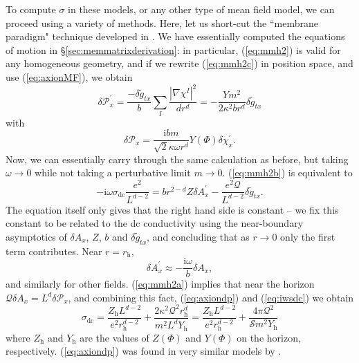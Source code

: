 \documentclass[10pt, oneside]{book}
\begin{document}
\begin{doublespace}
To compute $\sigma$ in these models, or any other type of mean field model, we can proceed using a variety of methods.   Here, let us short-cut the ``membrane paradigm" technique developed in \cite{Blake:2013bqa}.  We have essentially computed the equations of motion in  \S\ref{sec:memmatrixderivation}:  in particular, (\ref{eq:mmh2}) is valid for any homogeneous geometry, and if we rewrite (\ref{eq:mmh2c}) in position space, and use (\ref{eq:axionMF}), we obtain \begin{equation}
\delta \mathcal{P}_x^\prime = \frac{-\delta \tilde{g}_{tx}}{b} \sum_I \frac{|\nabla \chi^I|^2}{dr^d} = -\frac{Ym^2}{2\kappa^2 br^d}\delta \tilde{g}_{tx}   \label{eq:axiondp}
\end{equation}
with \begin{equation}
\delta \mathcal{P}_x = \frac{\mathrm{i}bm}{\sqrt{2}\kappa \omega r^d} Y(\Phi)  \delta \chi_x^\prime .
\end{equation}
Now,  we can essentially carry through the same calculation as before,  but taking $\omega\rightarrow 0$ while not taking a perturbative limit $m\rightarrow 0$.  (\ref{eq:mmh2b}) is equivalent to \begin{equation}
-\mathrm{i}\omega \sigma_{\mathrm{dc}} \frac{e^2}{L^{d-2}}  = br^{2-d}Z\delta A_x^\prime - \frac{e^2\mathcal{Q}}{L^{d-2}}\delta \tilde{g}_{tx}.  \label{eq:iwsdc}
\end{equation}
The equation itself only gives that the right hand side is constant -- we fix this constant to be related to the dc conductivity using the near-boundary asymptotics of $\delta A_x$, $Z$, $b$ and $\delta \tilde{g}_{tx}$, and concluding that as $r\rightarrow 0$ only the first term contributes.    Near $r=r_{\mathrm{h}}$,  \begin{equation}
\delta A_x^\prime \approx -\frac{\mathrm{i}\omega}{b} \delta A_x,  \label{eq:infallb}
\end{equation}and similarly for other fields.   (\ref{eq:mmh2a}) implies that near the horizon $\mathcal{Q}\delta A_x = L^d \delta \mathcal{P}_x$, and combining this fact,  (\ref{eq:axiondp}) and (\ref{eq:iwsdc}) we obtain \begin{equation}
\sigma_{\mathrm{dc}} = \frac{Z_{\mathrm{h}} L^{d-2}}{e^2r_{\mathrm{h}}^{d-2}} + \frac{2\kappa^2 \mathcal{Q}^2 r^d_{\mathrm{h}}}{m^2 L^dY_{\mathrm{h}}} =  \frac{Z_{\mathrm{h}} L^{d-2}}{e^2r_{\mathrm{h}}^{d-2}} + \frac{4\pi \mathcal{Q}^2}{\mathcal{S}m^2Y_{\mathrm{h}}}   \label{eq:axionsigma}
\end{equation}
where $Z_{\mathrm{h}}$ and $Y_{\mathrm{h}}$ are the values of $Z(\Phi)$ and $Y(\Phi)$ on the horizon, respectively.   (\ref{eq:axiondp}) was found in very similar models by  \cite{Donos:2014uba, Gouteraux:2014hca}.

\end{doublespace}
\end{document}
